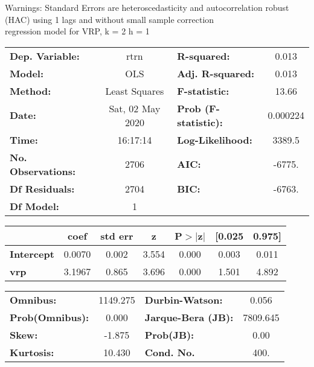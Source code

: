 Warnings: \newline
 [1] Standard Errors are heteroscedasticity and autocorrelation robust (HAC) using 1 lags and without small sample correction\\ 

regression model for VRP, k = 2 h = 1\begin{center}
\begin{tabular}{lclc}
\toprule
\textbf{Dep. Variable:}    &       rtrn       & \textbf{  R-squared:         } &     0.013   \\
\textbf{Model:}            &       OLS        & \textbf{  Adj. R-squared:    } &     0.013   \\
\textbf{Method:}           &  Least Squares   & \textbf{  F-statistic:       } &     13.66   \\
\textbf{Date:}             & Sat, 02 May 2020 & \textbf{  Prob (F-statistic):} &  0.000224   \\
\textbf{Time:}             &     16:17:14     & \textbf{  Log-Likelihood:    } &    3389.5   \\
\textbf{No. Observations:} &        2706      & \textbf{  AIC:               } &    -6775.   \\
\textbf{Df Residuals:}     &        2704      & \textbf{  BIC:               } &    -6763.   \\
\textbf{Df Model:}         &           1      & \textbf{                     } &             \\
\bottomrule
\end{tabular}
\begin{tabular}{lcccccc}
                   & \textbf{coef} & \textbf{std err} & \textbf{z} & \textbf{P$> |$z$|$} & \textbf{[0.025} & \textbf{0.975]}  \\
\midrule
\textbf{Intercept} &       0.0070  &        0.002     &     3.554  &         0.000        &        0.003    &        0.011     \\
\textbf{vrp}       &       3.1967  &        0.865     &     3.696  &         0.000        &        1.501    &        4.892     \\
\bottomrule
\end{tabular}
\begin{tabular}{lclc}
\textbf{Omnibus:}       & 1149.275 & \textbf{  Durbin-Watson:     } &    0.056  \\
\textbf{Prob(Omnibus):} &   0.000  & \textbf{  Jarque-Bera (JB):  } & 7809.645  \\
\textbf{Skew:}          &  -1.875  & \textbf{  Prob(JB):          } &     0.00  \\
\textbf{Kurtosis:}      &  10.430  & \textbf{  Cond. No.          } &     400.  \\
\bottomrule
\end{tabular}
\end{center}

